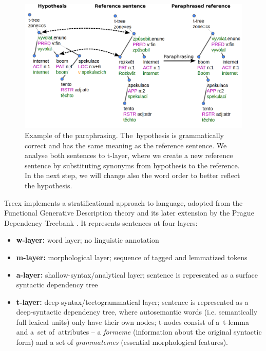 \begin{figure}[tb]
\begin{center}
\vspace{20pt}

\includegraphics[scale=0.4]{../img/treex_paraphrasing_example.png} 

\caption{Example of the paraphrasing. The~hypothesis is grammatically correct 
and has the same meaning as the reference sentence. We analyse both 
sentences to t-layer, where we create a new reference sentence by substituting
synonyms from hypothesis to the reference. In the next step, we will change also
the word order to better reflect the hypothesis.}
\label{example}
\end{center}
\end{figure}

Treex implements a stratificational approach to language, adopted from the 
Functional Generative Description theory \cite{FGP} and its later extension by 
the Prague Dependency Treebank \cite{PDT3.0}. It represents sentences at four 
layers:
\begin{itemize}
\item \textbf{w-layer:} word layer; no linguistic annotation
\item \textbf{m-layer:} morphological layer; sequence of tagged and lemmatized 
tokens
\item \textbf{a-layer:} shallow-syntax/analytical layer; sentence is 
represented as a surface syntactic dependency tree
\item \textbf{t-layer:} deep-syntax/tectogrammatical layer; sentence is 
represented as a deep-syntactic dependency tree, where autosemantic words (i.e.
semantically full lexical units) only have their own nodes; t-nodes consist of
a~t-lemma and a~set of~attributes -- a \textit{formeme} (information about the original syntactic form) and a set of \textit{grammatemes} 
(essential morphological features).
\end{itemize} 

